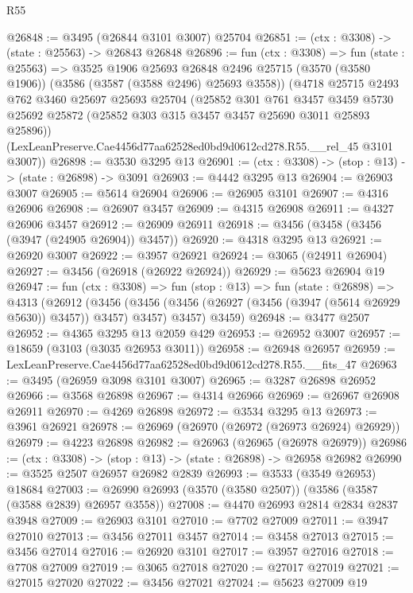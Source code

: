 \begin{lexlean}{R55}
\begin{coremodule}
@26848 := @3495 (@26844 @3101 @3007) @25704
@26851 := (ctx : @3308) -> (state : @25563) -> @26843 @26848
@26896 := fun (ctx : @3308) =>
  fun (state : @25563) =>
  @3525
    @1906
    @25693
    @26848
    @2496
    @25715
    (@3570 (@3580 @1906))
    (@3586 (@3587 (@3588 @2496) @25693 @3558))
    (@4718
      @25715
      @2493
      @762
      @3460
      @25697
      @25693
      @25704
      (@25852
        @301
        @761
        @3457
        @3459
        @5730
        @25692
        @25872
        (@25852 @303 @315 @3457 @3457 @25690 @3011 @25893 @25896))
      (LexLeanPreserve.Cae4456d77aa62528ed0bd9d0612cd278.R55.__rel_45 @3101 @3007))
@26898 := @3530 @3295 @13
@26901 := (ctx : @3308) -> (stop : @13) -> (state : @26898) -> @3091
@26903 := @4442 @3295 @13
@26904 := @26903 @3007
@26905 := @5614 @26904
@26906 := @26905 @3101
@26907 := @4316 @26906
@26908 := @26907 @3457
@26909 := @4315 @26908
@26911 := @4327 @26906 @3457
@26912 := @26909 @26911
@26918 := @3456 (@3458 (@3456 (@3947 (@24905 @26904)) @3457))
@26920 := @4318 @3295 @13
@26921 := @26920 @3007
@26922 := @3957 @26921
@26924 := @3065 (@24911 @26904)
@26927 := @3456 (@26918 (@26922 @26924))
@26929 := @5623 @26904 @19
@26947 := fun (ctx : @3308) =>
  fun (stop : @13) =>
  fun (state : @26898) =>
  @4313
    (@26912
      (@3456 (@3456 (@3456 (@26927 (@3456 (@3947 (@5614 @26929 @5630)) @3457)) @3457) @3457) @3457)
      @3459)
@26948 := @3477 @2507
@26952 := @4365 @3295 @13 @2059 @429
@26953 := @26952 @3007
@26957 := @18659 (@3103 (@3035 @26953 @3011))
@26958 := @26948 @26957
@26959 := LexLeanPreserve.Cae4456d77aa62528ed0bd9d0612cd278.R55.__fits_47
@26963 := @3495 (@26959 @3098 @3101 @3007)
@26965 := @3287 @26898 @26952
@26966 := @3568 @26898
@26967 := @4314 @26966
@26969 := @26967 @26908 @26911
@26970 := @4269 @26898
@26972 := @3534 @3295 @13
@26973 := @3961 @26921
@26978 := @26969 (@26970 (@26972 (@26973 @26924) @26929))
@26979 := @4223 @26898
@26982 := @26963 (@26965 (@26978 @26979))
@26986 := (ctx : @3308) -> (stop : @13) -> (state : @26898) -> @26958 @26982
@26990 := @3525 @2507 @26957 @26982 @2839
@26993 := @3533 (@3549 @26953) @18684
@27003 := @26990 @26993 (@3570 (@3580 @2507)) (@3586 (@3587 (@3588 @2839) @26957 @3558))
@27008 := @4470 @26993 @2814 @2834 @2837 @3948
@27009 := @26903 @3101
@27010 := @7702 @27009
@27011 := @3947 @27010
@27013 := @3456 @27011 @3457
@27014 := @3458 @27013
@27015 := @3456 @27014
@27016 := @26920 @3101
@27017 := @3957 @27016
@27018 := @7708 @27009
@27019 := @3065 @27018
@27020 := @27017 @27019
@27021 := @27015 @27020
@27022 := @3456 @27021
@27024 := @5623 @27009 @19

\end{coremodule}
\end{lexlean}
